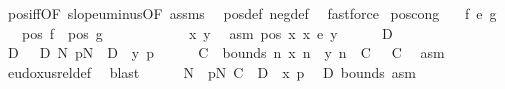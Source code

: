 \begin{isabellebody}
\ pos{\isacharunderscore}{\kern0pt}iff{\isacharbrackleft}{\kern0pt}OF\ slope{\isacharunderscore}{\kern0pt}uminus{\isacharprime}{\kern0pt}{\isacharbrackleft}{\kern0pt}OF\ assms{\isacharbrackright}{\kern0pt}{\isacharbrackright}{\kern0pt}\ \isamarkupfalse%
\ pos{\isacharunderscore}{\kern0pt}def\ neg{\isacharunderscore}{\kern0pt}def\ \isamarkupfalse%
\ fastforce\isanewline
{}\isamarkupfalse%
%
\endisatagproof
{\isafoldproof}%
%
\isadelimproof
\isanewline
%
\endisadelimproof
\isanewline
{}\isamarkupfalse%
\ pos{\isacharunderscore}{\kern0pt}cong{\isacharcolon}{\kern0pt}\isanewline
\ \ \ {\isachardoublequoteopen}f\ {\isasymsim}\isactrlsub e\ g{\isachardoublequoteclose}\isanewline
\ \ \ {\isachardoublequoteopen}pos\ f\ {\isacharequal}{\kern0pt}\ pos\ g{\isachardoublequoteclose}\isanewline
%
\isadelimproof
%
\endisadelimproof
%
\isatagproof
{}\isamarkupfalse%
\ {\isacharminus}{\kern0pt}\isanewline
\ \ \isacommand{{\isacharbraceleft}{\kern0pt}}\isamarkupfalse%
\ \isanewline
\ \ \ \ \isamarkupfalse%
\ x\ y\ \isamarkupfalse%
\ asm{\isacharcolon}{\kern0pt}\ {\isachardoublequoteopen}pos\ x{\isachardoublequoteclose}\ {\isachardoublequoteopen}x\ {\isasymsim}\isactrlsub e\ y{\isachardoublequoteclose}\isanewline
\ \ \ \ \isamarkupfalse%
\ D\ \isamarkupfalse%
\ D{\isacharcolon}{\kern0pt}\ {\isachardoublequoteopen}{}\ {\isasymle}\ D{\isachardoublequoteclose}\ {\isachardoublequoteopen}{\isasymforall}N{\isachardot}{\kern0pt}\ {\isasymexists}p{\isasymge}N{\isachardot}{\kern0pt}\ {\isasymnot}\ D\ {\isasymle}\ y\ p{\isachardoublequoteclose}\isanewline
\ \ \ \ \isamarkupfalse%
\ C\ \ bounds{\isacharcolon}{\kern0pt}\ {\isachardoublequoteopen}{\isasymforall}n{\isachardot}{\kern0pt}\ {\isasymbar}x\ n\ {\isacharminus}{\kern0pt}\ y\ n{\isasymbar}\ {\isasymle}\ C{\isachardoublequoteclose}\ {\isachardoublequoteopen}{}\ {\isasymle}\ C{\isachardoublequoteclose}\ \isamarkupfalse%
\ asm\ \isamarkupfalse%
\ eudoxus{\isacharunderscore}{\kern0pt}rel{\isacharunderscore}{\kern0pt}def\ \isamarkupfalse%
\ blast\isanewline
\ \ \ \ \isamarkupfalse%
\ N\ \ {\isachardoublequoteopen}{\isasymforall}p{\isasymge}N{\isachardot}{\kern0pt}\ C\ {\isacharplus}{\kern0pt}\ D\ {\isasymle}\ x\ p{\isachardoublequoteclose}\ \isamarkupfalse%
\ D\ bounds\ asm\ \isamarkupfalse%

\end{isabellebody}
